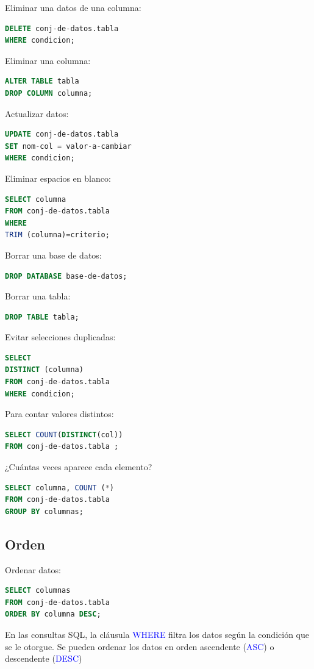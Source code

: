 \documentclass[a4paper, 12pt]{book}
\begin{document}
Eliminar una datos de una columna:
\begin{lstlisting}[language=SQL]
DELETE conj-de-datos.tabla
WHERE condicion;
\end{lstlisting}


Eliminar una columna:
\begin{lstlisting}[language=SQL]
ALTER TABLE tabla
DROP COLUMN columna;
\end{lstlisting}


Actualizar datos:
\begin{lstlisting}[language=SQL]
UPDATE conj-de-datos.tabla
SET nom-col = valor-a-cambiar
WHERE condicion;
\end{lstlisting}


Eliminar espacios en blanco:
\begin{lstlisting}[language=SQL]
SELECT columna
FROM conj-de-datos.tabla
WHERE
TRIM (columna)=criterio;
\end{lstlisting}


Borrar una base de datos:
\begin{lstlisting}[language=SQL]
DROP DATABASE base-de-datos;
\end{lstlisting}


Borrar una tabla:
\begin{lstlisting}[language=SQL]
DROP TABLE tabla;
\end{lstlisting}


Evitar selecciones duplicadas:
\begin{lstlisting}[language=SQL]
SELECT
DISTINCT (columna)
FROM conj-de-datos.tabla
WHERE condicion;
\end{lstlisting}


Para contar valores distintos:
\begin{lstlisting}[language=SQL]
SELECT COUNT(DISTINCT(col))
FROM conj-de-datos.tabla ;
\end{lstlisting}


¿Cuántas veces aparece cada elemento?
\begin{lstlisting}[language=SQL]
SELECT columna, COUNT (*)
FROM conj-de-datos.tabla
GROUP BY columnas;
\end{lstlisting}
\subsection{Orden}
Ordenar datos:
\begin{lstlisting}[language=SQL]
SELECT columnas
FROM conj-de-datos.tabla
ORDER BY columna DESC;
\end{lstlisting}
En las consultas SQL, la cláusula \textcolor{blue}{WHERE} filtra los datos según la condición que se le otorgue. Se pueden ordenar los datos en orden ascendente (\textcolor{blue}{ASC}) o descendente (\textcolor{blue}{DESC})
\end{document}
